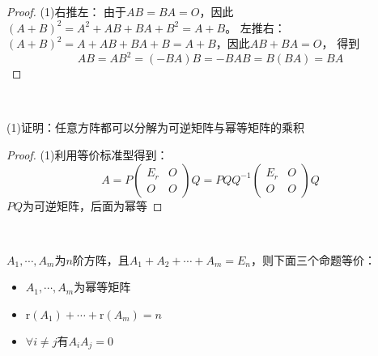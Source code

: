 \begin{proof}
  (1)右推左：
  由于$AB = BA = O$，因此$(A+B)^2 = A^2 + AB + BA + B^2 = A+B$。
  左推右：$(A+B)^2 = A+AB+BA+B=A+B$，因此$AB+BA = O$，
  得到
  \begin{equation*}
    AB = AB^2 = (-BA)B = -BAB = B(BA) = BA
  \end{equation*}
\end{proof}

~

\begin{exercise}[幂等矩阵分解]
  (1)证明：任意方阵都可以分解为可逆矩阵与幂等矩阵的乘积
\end{exercise}

\begin{proof}
  (1)利用等价标准型得到：
  \begin{equation*}
    A = P \left(
      \begin{array}{cc}
        E_r&O\\
        O&O
      \end{array}
    \right)Q = PQ Q^{-1} \left(
      \begin{array}{cc}
        E_r&O\\
        O&O
      \end{array}
    \right) Q
  \end{equation*}
  $PQ$为可逆矩阵，后面为幂等
\end{proof}

~

\begin{theorem}[幂等矩阵列的性质]
  $A_1,\cdots,A_m$为$n$阶方阵，且$A_1+A_2 + \cdots + A_m = E_n$，则下面三个命题等价：
  \begin{itemize}
  \item $A_1,\cdots,A_m$为幂等矩阵
  \item $\mathrm{r}(A_1) + \cdots + \mathrm{r}(A_m) = n$
  \item $\forall i\neq j$有$A_iA_j = 0$
  \end{itemize}
\end{theorem}

